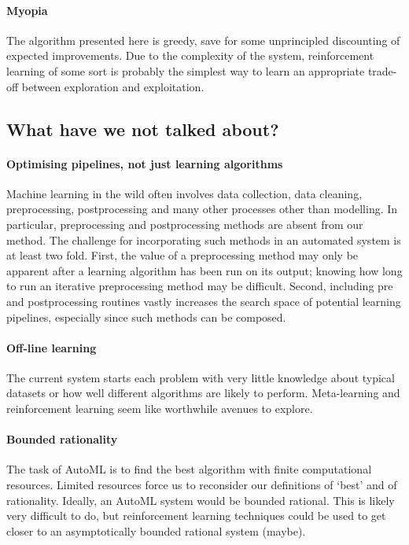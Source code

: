 \documentclass{article} %
\begin{document}
\paragraph{Myopia}

The algorithm presented here is greedy, save for some unprincipled discounting of expected improvements.
Due to the complexity of the system, reinforcement learning of some sort is probably the simplest way to learn an appropriate trade-off between exploration and exploitation.

\subsection{What have we not talked about?}

\paragraph{Optimising pipelines, not just learning algorithms}

Machine learning in the wild often involves data collection, data cleaning, preprocessing, postprocessing and many other processes other than modelling.
In particular, preprocessing and postprocessing methods are absent from our method.
The challenge for incorporating such methods in an automated system is at least two fold.
First, the value of a preprocessing method may only be apparent after a learning algorithm has been run on its output; knowing how long to run an iterative preprocessing method may be difficult.
Second, including pre and postprocessing routines vastly increases the search space of potential learning pipelines, especially since such methods can be composed.

\paragraph{Off-line learning}

The current system starts each problem with very little knowledge about typical datasets or how well different algorithms are likely to perform.
Meta-learning and reinforcement learning seem like worthwhile avenues to explore.

\paragraph{Bounded rationality}

The task of AutoML is to find the best algorithm with finite computational resources.
Limited resources force us to reconsider our definitions of `best' and of rationality.
Ideally, an AutoML system would be bounded rational.
This is likely very difficult to do, but reinforcement learning techniques could be used to get closer to an asymptotically bounded rational system (maybe).


\small



\end{document}
